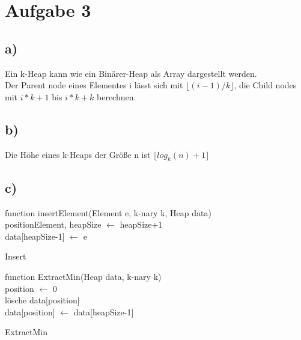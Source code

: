 \documentclass[a4paper]{scrartcl}
\begin{document}
\section*{Aufgabe 3}
\subsection*{a)}

Ein k-Heap kann wie ein Binärer-Heap als Array dargestellt werden.\\
Der Parent node eines Elementes i lässt sich mit  
$\lfloor(i-1)/k \rfloor$, die Child nodes mit $i*k+1 $ bis $i*k+k$ berechnen. 
\subsection*{b)}
Die Höhe eines k-Heaps der Größe n ist $\lfloor log_k(n)+1 \rfloor $
\subsection*{c)}

\begin{algorithm}[H]
 function insertElement(Element e, k-nary k, Heap data)\\
 	positionElement, heapSize $\leftarrow$ heapSize+1\\
 	data[heapSize-1] $\leftarrow$ e\\
 	
 \caption{Insert}
\end{algorithm}

\begin{algorithm}[H]
 function ExtractMin(Heap data, k-nary k)\\
  position $\leftarrow$ 0\\
  lösche data[position]\\
  data[position] $\leftarrow$ data[heapSize-1]\\
 \caption{ExtractMin}
\end{algorithm}
\end{document}
